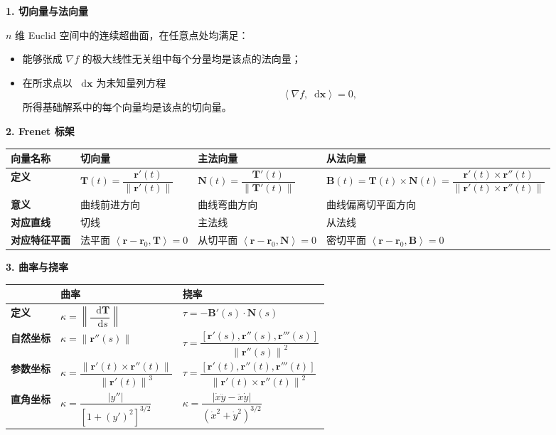 \documentclass[UTF8,fontset=fandol,zihao=5]{ctexart}
\newcommand{\dd}{\mathop{}\!\mathrm{d}}
\newcommand{\norm}[1]{\left\lVert#1\right\rVert}
\newcommand{\inner}[2]{\left\langle#1,#2\right\rangle}
\begin{document}
\textbf{1. 切向量与法向量}

$n$ 维 Euclid 空间中的连续超曲面，在任意点处均满足：

\begin{itemize}
  \item 能够张成 $\nabla f$ 的极大线性无关组中每个分量均是该点的法向量；
  \item 在所求点以 $\dd\bm x$ 为未知量列方程
  \[
  \inner{\nabla f}{\dd\bm x}=0,
  \]
  所得基础解系中的每个向量均是该点的切向量。
\end{itemize}

\textbf{2. Frenet 标架}

\begin{center}
\begin{tabularx}{\textwidth}{>{\bfseries}p{2.1cm}XXX}
\toprule
向量名称 & 切向量 & 主法向量 & 从法向量 \\
\midrule
定义 &
$\bm T(t)=\dfrac{\bm r'(t)}{\norm{\bm r'(t)}}$ &
$\bm N(t)=\dfrac{\bm T'(t)}{\norm{\bm T'(t)}}$ &
$\bm B(t)=\bm T(t)\times\bm N(t)=\dfrac{\bm r'(t)\times\bm r''(t)}{\norm{\bm r'(t)\times\bm r''(t)}}$ \\
意义 & 曲线前进方向 & 曲线弯曲方向 & 曲线偏离切平面方向 \\
对应直线 & 切线 & 主法线 & 从法线 \\
对应特征平面 & 法平面 $\inner{\bm r-\bm r_0}{\bm T}=0$ &
从切平面 $\inner{\bm r-\bm r_0}{\bm N}=0$ &
密切平面 $\inner{\bm r-\bm r_0}{\bm B}=0$ \\
\bottomrule
\end{tabularx}
\end{center}

\textbf{3. 曲率与挠率}

\begin{center}
\begin{tabularx}{\textwidth}{>{\bfseries}p{2.2cm}XX}
\toprule
 & 曲率 & 挠率 \\
\midrule
定义 & $\kappa=\left\lVert\dfrac{\dd\bm T}{\dd s}\right\rVert$ & $\tau=-\bm B'(s)\cdot\bm N(s)$ \\
自然坐标 & $\kappa=\norm{\bm r''(s)}$ & $\tau=\dfrac{[\bm r'(s),\bm r''(s),\bm r'''(s)]}{\norm{\bm r''(s)}^2}$ \\
参数坐标 & $\kappa=\dfrac{\norm{\bm r'(t)\times\bm r''(t)}}{\norm{\bm r'(t)}^3}$ & $\tau=\dfrac{[\bm r'(t),\bm r''(t),\bm r'''(t)]}{\norm{\bm r'(t)\times\bm r''(t)}^2}$ \\
直角坐标 & $\kappa=\dfrac{|y''|}{[1+(y')^2]^{3/2}}$ & $\kappa=\dfrac{|\dot x\ddot y-\ddot x\dot y|}{(\dot x^2+\dot y^2)^{3/2}}$ \\
\bottomrule
\end{tabularx}
\end{center}
\end{document}
